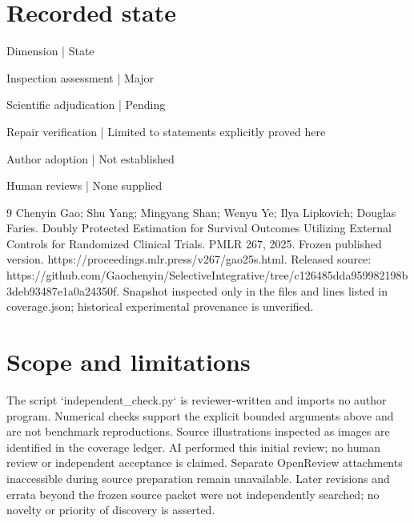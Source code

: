 \documentclass[10pt]{article}
\begin{document}
\section*{Recorded state}
Dimension | State\par
Inspection assessment | Major\par
Scientific adjudication | Pending\par
Repair verification | Limited to statements explicitly proved here\par
Author adoption | Not established\par
Human reviews | None supplied\par
9 Chenyin Gao; Shu Yang; Mingyang Shan; Wenyu Ye; Ilya Lipkovich; Douglas Faries. Doubly Protected Estimation for Survival Outcomes Utilizing External Controls for Randomized Clinical Trials. PMLR 267, 2025. Frozen published version. https://proceedings.mlr.press/v267/gao25s.html. Released source: https://github.com/Gaochenyin/SelectiveIntegrative/tree/c126485dda959982198b3deb93487e1a0a24350f. Snapshot inspected only in the files and lines listed in coverage.json; historical experimental provenance is unverified.\par
\section*{Scope and limitations}
The script `independent\_check.py` is reviewer-written and imports no author program. Numerical checks support the explicit bounded arguments above and are not benchmark reproductions. Source illustrations inspected as images are identified in the coverage ledger. AI performed this initial review; no human review or independent acceptance is claimed. Separate OpenReview attachments inaccessible during source preparation remain unavailable. Later revisions and errata beyond the frozen source packet were not independently searched; no novelty or priority of discovery is asserted.\par
\end{document}
